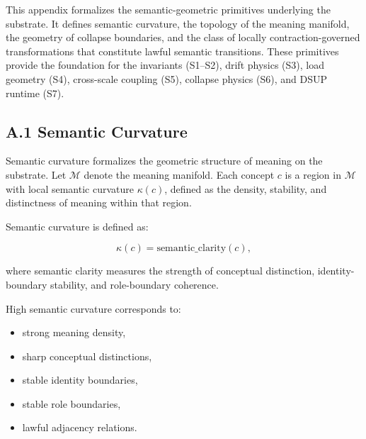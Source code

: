 
This appendix formalizes the semantic-geometric primitives underlying the
substrate. It defines semantic curvature, the topology of the meaning manifold,
the geometry of collapse boundaries, and the class of locally contraction-governed
transformations that constitute lawful semantic transitions. These primitives
provide the foundation for the invariants (S1--S2), drift physics (S3), load
geometry (S4), cross-scale coupling (S5), collapse physics (S6), and DSUP
runtime (S7).


\subsection*{A.1 Semantic Curvature}

\noindent Semantic curvature formalizes the geometric structure of meaning on the
substrate. Let $\mathcal{M}$ denote the meaning manifold. Each concept $c$ is a
region in $\mathcal{M}$ with local semantic curvature $\kappa(c)$, defined as the
density, stability, and distinctness of meaning within that region.

\medskip

\noindent Semantic curvature is defined as:



\[
\kappa(c) = \text{semantic\_clarity}(c),
\]



\noindent where semantic clarity measures the strength of conceptual distinction,
identity-boundary stability, and role-boundary coherence.

\medskip

\noindent High semantic curvature corresponds to:

\begin{itemize}
    \item strong meaning density,
    \item sharp conceptual distinctions,
    \item stable identity boundaries,
    \item stable role boundaries,
    \item lawful adjacency relations.
\end{itemize}

